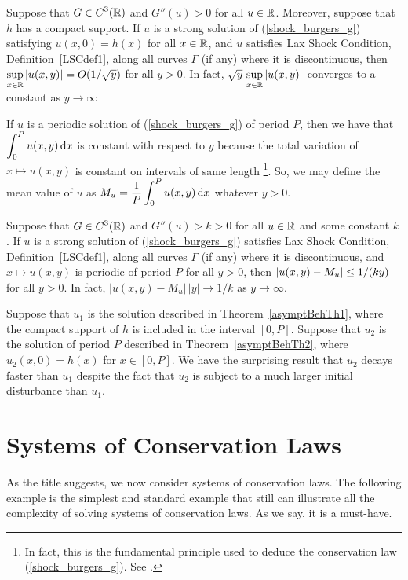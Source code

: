 \begin{theorem} \label{asymptBehTh1}
Suppose that $\displaystyle G \in C^3(\mathbb{R})$ and $G''(u) >0$ for all $u\in \mathbb{R}$.
Moreover, suppose that $h$ has a compact support.
If $u$ is a strong solution of (\ref{shock_burgers_g}) satisfying
$u(x,0) = h(x)$ for all $x \in \mathbb{R}$, and $u$ satisfies Lax Shock
Condition, Definition~\ref{LSCdef1}, along all curves $\Gamma$ (if
any) where it is discontinuous, then
$\displaystyle \sup_{x\in\mathbb{R}} |u(x,y)| = O(1/\sqrt{y})$ for all $y>0$.
In fact, $\displaystyle \sqrt{y}\, \sup_{x\in\mathbb{R}} |u(x,y)|$ converges to
a constant as $y \to \infty$
\end{theorem}

If $u$ is a periodic solution of (\ref{shock_burgers_g}) of period
$P$, then we have that $\displaystyle \int_0^P u(x,y) \,\mathrm{d}{x}$ is constant
with respect to $y$ because the total variation of $x \mapsto u(x,y)$
is constant on intervals of same length \footnote{In fact, this is the
fundamental principle used to deduce the conservation law
(\ref{shock_burgers_g}).  See \cite{Lax2}.}.  So, we may define the
mean value of $u$ as
$\displaystyle M_u = \frac{1}{P}\int_0^P u(x,y) \,\mathrm{d}{x}$ whatever $y>0$.

\begin{theorem} \label{asymptBehTh2}
Suppose that $\displaystyle G \in C^3(\mathbb{R})$ and $G''(u) > k >0$
for all $u\in \mathbb{R}$ and some constant $k$.  If $u$ is a strong solution of
(\ref{shock_burgers_g}) satisfies Lax Shock Condition,
Definition~\ref{LSCdef1}, along all curves $\Gamma$ (if any) where it is
discontinuous, and $x\mapsto u(x,y)$ is periodic of period $P$
for all $y>0$, then
$\displaystyle |u(x,y) - M_u| \leq 1/(ky)$ for all $y>0$.
In fact, $|u(x,y) - M_u| \, |y| \to 1/k$ as $y \to \infty$.
\end{theorem}

Suppose that $u_1$ is the solution described in
Theorem~\ref{asymptBehTh1}, where the compact support of $h$ is
included in the interval $[0,P]$.
Suppose that $u_2$ is the solution of period $P$ described in
Theorem~\ref{asymptBehTh2}, where $u_2(x,0) = h(x)$ for $x\in[0,P]$.
We have the surprising result that $u_2$ decays faster than $u_1$
despite the fact that $u_2$ is subject to a much larger initial
disturbance than $u_1$.

\section{Systems of Conservation Laws}

As the title suggests, we now consider systems of conservation laws.
The following example is the simplest and standard example that still
can illustrate all the complexity of solving systems of conservation
laws.  As we say, it is a must-have.

